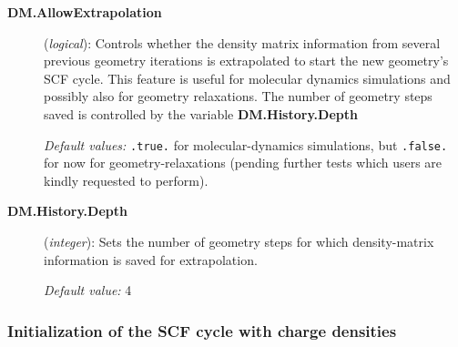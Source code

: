 \begin{description}
\item[\textbf{DM.AllowExtrapolation}] (\textit{logical}):
   Controls
  whether the density matrix information from several previous
  geometry iterations is extrapolated to start the new geometry's SCF
  cycle.  This feature is useful for molecular dynamics simulations
  and possibly also for geometry relaxations.  The number of geometry
  steps saved is controlled by the variable \textbf{DM.History.Depth}

\textit{Default values:} \texttt{.true.} for molecular-dynamics simulations,
but \texttt{.false.} for now for geometry-relaxations (pending further
tests which users are kindly requested to perform).


\item[\textbf{DM.History.Depth}] (\textit{integer}):
Sets the number of geometry steps for which density-matrix information
is saved for extrapolation.

\textit{Default value:} 4

\end{description}

\subsubsection{Initialization of the SCF cycle with charge densities}

